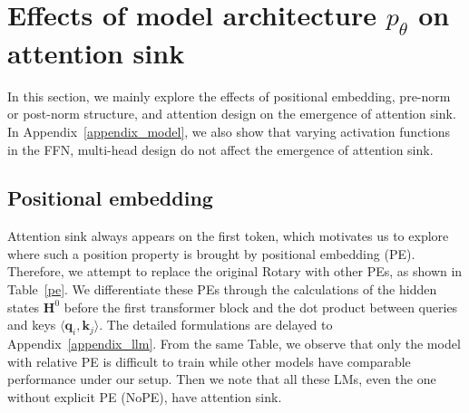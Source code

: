 


\vspace{-0.2cm}
\section{Effects of {\color{cc4}model architecture \texorpdfstring{$p_{\theta}$}{TEXT}} on attention sink}
\vspace{-0.2cm}
\label{sec7}

In this section, we mainly explore the effects of positional embedding, pre-norm or post-norm structure, and attention design on the emergence of attention sink. In Appendix~\ref{appendix_model}, we also show that varying activation functions in the FFN, multi-head design do not affect the emergence of attention sink.

\vspace{-0.15cm}
\subsection{Positional embedding}
\vspace{-0.15cm}


Attention sink always appears on the first token, which motivates us to explore where such a position property is brought by positional embedding (PE). Therefore, we attempt to replace the original Rotary with other PEs, as shown in Table~\ref{pe}. We differentiate these PEs through the calculations of the hidden states $\boldsymbol{H}^0$ before the first transformer block and the dot product between queries and keys $\langle\boldsymbol{q}_i\textrm{,}\,\boldsymbol{k}_j\rangle$. The detailed formulations are delayed to Appendix~\ref{appendix_llm}. From the same Table, we observe that only the model with relative PE is difficult to train while other models have comparable performance under our setup. Then we note that all these LMs, even the one without explicit PE (NoPE), have attention sink.



